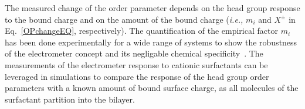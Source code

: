 The measured change of the order parameter depends on the head group response to the bound charge 
and on the amount of the bound charge (\textit{i.e.,} $m_i$ and $X^\pm$ in Eq.~\ref{OPchangeEQ}, respectively).  
The quantification of the empirical factor $m_i$ has been done experimentally for a wide range of systems
to show the robustness of the electrometer concept and its negligable chemical specificity~\citep{seelig87, beschiasvili91}. 
The measurements of the electrometer response to cationic surfactants 
can be leveraged in simulations to compare the response of the head group order parameters 
with a known amount of bound surface charge,
as all molecules of the surfactant partition into the bilayer. 


